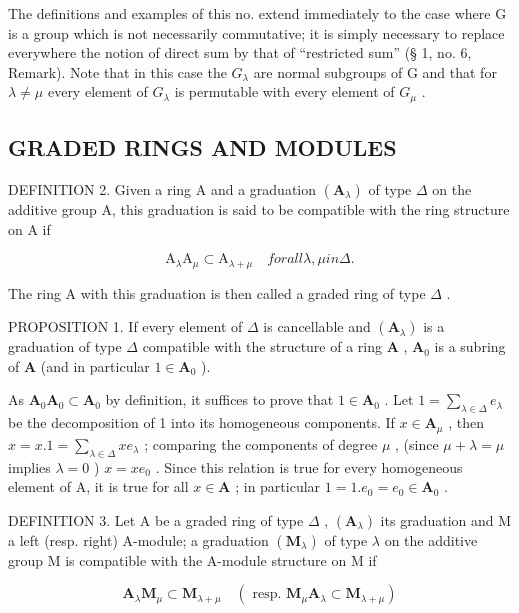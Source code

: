 The definitions and examples of this no. extend immediately to the case where G is a group which is not necessarily commutative; it is simply necessary to replace everywhere the notion of direct sum by that of ``restricted sum'' (§ 1, no. 6, Remark). Note that in this case the \(G_{\lambda}\) are normal subgroups of G and that for \(\lambda \neq \mu\) every element of \(G_{\lambda}\) is permutable with every element of \(G_{\mu}\) .

\subsection{GRADED RINGS AND MODULES}

DEFINITION 2. Given a ring A and a graduation \((\mathbf{A}_{\lambda})\) of type \(\Delta\) on the additive group A, this graduation is said to be compatible with the ring structure on A if

\[
\mathrm{A} _ {\lambda} \mathrm{A} _ {\mu} \subset \mathrm{A} _ {\lambda + \mu} \quad f o r a l l \lambda , \mu i n \Delta .\tag{1}
\]

The ring A with this graduation is then called a graded ring of type \(\Delta\) .

PROPOSITION 1. If every element of \(\Delta\) is cancellable and \((\mathbf{A}_{\lambda})\) is a graduation of type \(\Delta\) compatible with the structure of a ring \(\mathbf{A}\) , \(\mathbf{A}_0\) is a subring of \(\mathbf{A}\) (and in particular \(1 \in \mathbf{A}_0\) ).

As \(\mathbf{A}_0\mathbf{A}_0\subset \mathbf{A}_0\) by definition, it suffices to prove that \(1\in \mathbf{A}_0\) . Let \(1 = \sum_{\lambda \in \Delta}e_{\lambda}\) be the decomposition of 1 into its homogeneous components. If \(x\in \mathbf{A}_{\mu}\) , then \(x = x.1 = \sum_{\lambda \in \Delta}xe_{\lambda}\) ; comparing the components of degree \(\mu\) , (since \(\mu +\lambda = \mu\) implies \(\lambda = 0\) ) \(x = xe_0\) . Since this relation is true for every homogeneous element of A, it is true for all \(x\in \mathbf{A}\) ; in particular \(1 = 1.e_0 = e_0\in \mathbf{A}_0\) .

DEFINITION 3. Let A be a graded ring of type \(\Delta\) , \((\mathbf{A}_{\lambda})\) its graduation and M a left (resp. right) A-module; a graduation \((\mathbf{M}_{\lambda})\) of type \(\lambda\) on the additive group M is compatible with the A-module structure on M if

\[
\mathbf {A} _ {\lambda} \mathbf {M} _ {\mu} \subset \mathbf {M} _ {\lambda + \mu} \quad (\text { resp. } \mathbf {M} _ {\mu} \mathbf {A} _ {\lambda} \subset \mathbf {M} _ {\lambda + \mu})\tag{2}
\]

